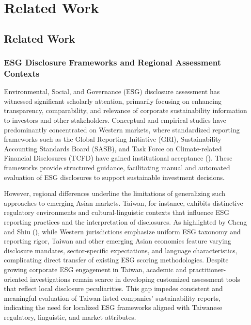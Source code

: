 \documentclass[
  12pt,
]{article}
\begin{document}
\section{Related Work}\label{related-work}

\subsection{Related Work}\label{related-work-1}

\subsubsection{ESG Disclosure Frameworks and Regional Assessment
Contexts}\label{esg-disclosure-frameworks-and-regional-assessment-contexts}

Environmental, Social, and Governance (ESG) disclosure assessment has
witnessed significant scholarly attention, primarily focusing on
enhancing transparency, comparability, and relevance of corporate
sustainability information to investors and other stakeholders.
Conceptual and empirical studies have predominantly concentrated on
Western markets, where standardized reporting frameworks such as the
Global Reporting Initiative (GRI), Sustainability Accounting Standards
Board (SASB), and Task Force on Climate-related Financial Disclosures
(TCFD) have gained institutional acceptance
(). These frameworks
provide structured guidance, facilitating manual and automated
evaluation of ESG disclosures to support sustainable investment
decisions.

However, regional differences underline the limitations of generalizing
such approaches to emerging Asian markets. Taiwan, for instance,
exhibits distinctive regulatory environments and cultural-linguistic
contexts that influence ESG reporting practices and the interpretation
of disclosures. As highlighted by Cheng and Shiu
(), while Western jurisdictions emphasize
uniform ESG taxonomy and reporting rigor, Taiwan and other emerging
Asian economies feature varying disclosure mandates, sector-specific
expectations, and language characteristics, complicating direct transfer
of existing ESG scoring methodologies. Despite growing corporate ESG
engagement in Taiwan, academic and practitioner-oriented investigations
remain scarce in developing customized assessment tools that reflect
local disclosure peculiarities. This gap impedes consistent and
meaningful evaluation of Taiwan-listed companies' sustainability
reports, indicating the need for localized ESG frameworks aligned with
Taiwanese regulatory, linguistic, and market attributes.
\end{document}
